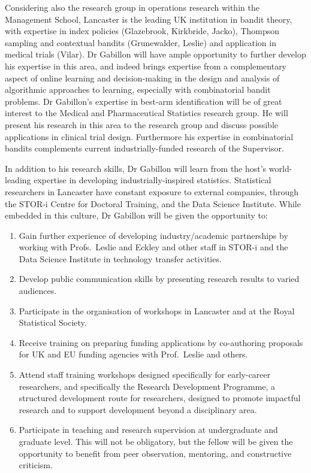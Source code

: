 \documentclass[a4paper,11pt]{article}
\begin{document}
Considering also the research group in operations research within the Management School, Lancaster is the leading UK institution in bandit theory, with expertise in index policies (Glazebrook, Kirkbride, Jacko), Thompson sampling and contextual bandits (Grunewalder, Leslie) and application in medical trials (Vilar). Dr Gabillon will have ample opportunity to further develop his expertise in this area, and indeed brings expertise from a complementary aspect of online learning and decision-making in the design and analysis of algorithmic approaches to learning, especially with combinatorial bandit problems.   Dr Gabillon's expertise in best-arm identification will be of great interest to the Medical and Pharmaceutical Statistics research group.  He will present his research in this area to the research group and discuss possible applications in clinical trial design.  Furthermore his expertise in combinatorial bandits complements current industrially-funded research of the Supervisor.

In addition to his research skills, Dr Gabillon will learn from the host's world-leading expertise in developing industrially-inspired statistics.  Statistical researchers in Lancaster have constant exposure to external companies, through the STOR-i Centre for Doctoral Training, and the Data Science Institute.  While embedded in this culture, Dr Gabillon will be given the opportunity to:
\begin{enumerate}
\item Gain further experience of developing industry/academic partnerships by working with Profs.\ Leslie and Eckley and other staff in STOR-i and the Data Science Institute in technology transfer activities.
\item Develop public communication skills by presenting research results to varied audiences.
\item Participate in the organisation of workshops in Lancaster and at the Royal Statistical Society.
\item Receive training on preparing funding applications by co-authoring proposals for UK and EU funding agencies with Prof.\ Leslie and others.
\item Attend staff training workshops designed specifically for early-career researchers, and specifically the Research Development Programme, a structured development route for researchers, designed to promote impactful research and to support development beyond a disciplinary area.
\item Participate in teaching and research supervision at undergraduate and graduate level.  This will not be obligatory, but the fellow will be given the opportunity to benefit from peer observation, mentoring, and constructive criticism.
\end{enumerate}
\end{document}
